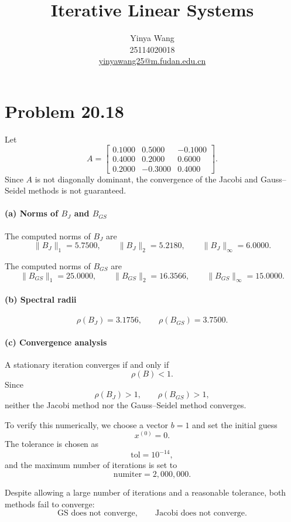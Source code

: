 \documentclass{ctexart}
\title{Iterative Linear Systems}
\author{
  Yinya Wang\\
  25114020018\\
  \href{mailto:yinyawang25@m.fudan.edu.cn}{yinyawang25@m.fudan.edu.cn}
}
\date{}
\begin{document}
\maketitle
\section{Problem 20.18}

Let
\[
  A=
  \begin{bmatrix}
    0.1000 & 0.5000 & -0.1000\\
    0.4000 & 0.2000 & 0.6000\\
    0.2000 & -0.3000 & 0.4000
  \end{bmatrix}.
\]
Since $A$ is not diagonally dominant, the convergence of the Jacobi and Gauss--Seidel methods is not guaranteed.

\paragraph{(a) Norms of $B_J$ and $B_{GS}$}

The computed norms of $B_J$ are
\[
  \|B_J\|_1 = 5.7500,\qquad
  \|B_J\|_2 = 5.2180,\qquad
  \|B_J\|_\infty = 6.0000.
\]

The computed norms of $B_{GS}$ are
\[
  \|B_{GS}\|_1 = 25.0000,\qquad
  \|B_{GS}\|_2 = 16.3566,\qquad
  \|B_{GS}\|_\infty = 15.0000.
\]

\paragraph{(b) Spectral radii}

\[
  \rho(B_J)=3.1756,\qquad
  \rho(B_{GS})=3.7500.
\]

\paragraph{(c) Convergence analysis}

A stationary iteration converges if and only if
\[
  \rho(B)<1.
\]
Since
\[
  \rho(B_J)>1,\qquad \rho(B_{GS})>1,
\]
neither the Jacobi method nor the Gauss--Seidel method converges.

To verify this numerically, we choose a vector $b=1$ and set the initial guess
\[
  x^{(0)}=0.
\]
The tolerance is chosen as
\[
  \text{tol} = 10^{-14},
\]
and the maximum number of iterations is set to
\[
  \text{numiter} = 2{,}000{,}000.
\]

Despite allowing a large number of iterations and a reasonable tolerance, both methods fail to converge:
\[
  \text{GS does not converge},\qquad
  \text{Jacobi does not converge}.
\]
\end{document}
